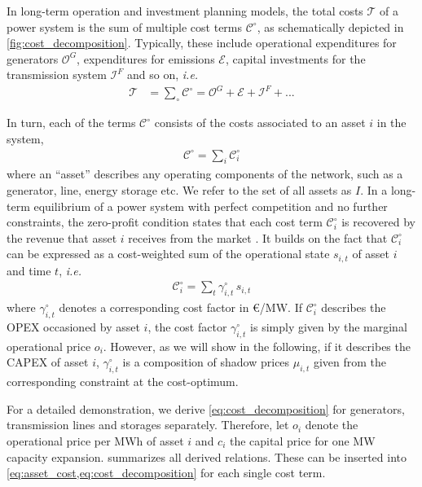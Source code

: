 \documentclass[11pt,twocolumn]{article}
\newcommand{\ie}{\textit{i.e.} }
\newcommand{\state}[1][i]{s_{#1,t}}
\newcommand{\costfactor}{\gamma^\circ_{i,t}}
\newcommand{\totalcost}{\mathcal{T}}
\newcommand{\cost}[1][\circ]{\mathcal{C}^{#1}}
\newcommand{\opexgeneration}{\mathcal{O}^G}
\newcommand{\capexflow}{\mathcal{I}^F}
\newcommand{\emissioncost}{\mathcal{E}}
\begin{document}
In long-term operation and investment planning models, the total costs $\totalcost$ of a power system is the sum of multiple cost terms $\cost$, as schematically depicted in \cref{fig:cost_decomposition}. Typically, these include operational expenditures for generators $\opexgeneration$, expenditures for emissions $\emissioncost$,  capital investments for the transmission system $\capexflow$ and so on, \ie
\begin{align}
\totalcost &= \sum_\circ \cost = \opexgeneration + \emissioncost +  \capexflow + ...
\label{eq:total_cost}
\end{align}

In turn, each of the terms $\cost$ consists of the costs associated to an asset $i$ in the system, 
\begin{align}
    \cost = \sum_{i} \cost_{i}
    \label{eq:asset_cost}
\end{align} 
where an ``asset'' describes any operating components of the network, such as a generator, line, energy storage etc. We refer to the set of all assets as $I$. 
In a long-term equilibrium of a power system with perfect competition and no further constraints, the zero-profit condition states that each cost term $\cost_{i}$ is recovered by the revenue that asset $i$ receives from the market \cite{steiner_peak_1957}. It builds on the fact that $\cost_i$ can be expressed as a cost-weighted sum of the operational state $s_{i,t}$ of asset $i$ and time $t$, \ie
\begin{align}
    \cost_{i} = \sum_t  \costfactor \, \state
    \label{eq:cost_decomposition}
\end{align}
where $\costfactor$ denotes a corresponding cost factor in \euro/MW. 
If $\cost_i$ describes the OPEX occasioned by asset $i$, the cost factor $\costfactor$ is simply given by the marginal operational price $o_i$. However, as we will show in the following, if it describes the CAPEX of asset $i$, $\costfactor$ is a composition of shadow prices $\mu_{i,t}$ given from the corresponding constraint at the cost-optimum. 

For a detailed demonstration, we derive  \cref{eq:cost_decomposition} for generators, transmission lines and storages separately. Therefore, let $o_i$ denote the operational price per MWh of asset $i$ and $c_i$ the capital price for one MW capacity expansion.  summarizes all derived relations. These can be inserted into \cref{eq:asset_cost,eq:cost_decomposition} for each single cost term.
\end{document}
